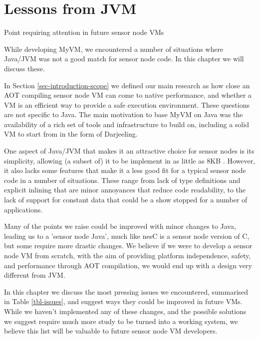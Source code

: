 \chapter{Lessons from JVM}
\begin{table}
    \centering
    \caption{Point requiring attention in future sensor node VMs}
    \label{tbl-issues}
    
\end{table}

\label{sec-lessons-from-jvm}
While developing MyVM, we encountered a number of situations where Java/JVM was not a good match for sensor node code. In this chapter we will discuss these.

In Section \ref{sec-introduction-scope} we defined our main research as how close an AOT compiling sensor node VM can come to native performance, and whether a VM is an efficient way to provide a safe execution environment. These questions are not specific to Java. The main motivation to base MyVM on Java was the availability of a rich set of tools and infrastructure to build on, including a solid VM to start from in the form of Darjeeling.

One aspect of Java/JVM that makes it an attractive choice for sensor nodes is its simplicity, allowing (a subset of) it to be implement in as little as 8KB \cite{Harbaum}. However, it also lacks some features that make it a less good fit for a typical sensor node code in a number of situations. These range from lack of type definitions and explicit inlining that are minor annoyances that reduce code readability, to the lack of support for constant data that could be a show stopped for a number of applications.

Many of the points we raise could be improved with minor changes to Java, leading us to a 'sensor node Java', much like nesC \cite{Gay:2003up} is a sensor node version of C, but some require more drastic changes. We believe if we were to develop a sensor node VM from scratch, with the aim of providing platform independence, safety, and performance through AOT compilation, we would end up with a design very different from JVM.

In this chapter we discuss the most pressing issues we encountered, summarised in Table \ref{tbl-issues}, and suggest ways they could be improved in future VMs. While we haven't implemented any of these changes, and the possible solutions we suggest require much more study to be turned into a working system, we believe this list will be valuable to future sensor node VM developers.




